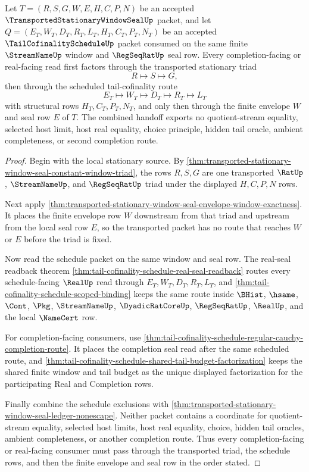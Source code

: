 \begin{theorem}
\label{thm:transported-stationary-window-seal-tail-cofinality-handoff}
Let $T=(R,S,G,W,E,H,C,P,N)$ be an accepted $\TransportedStationaryWindowSealUp$ packet, and let $Q=(E_T,W_T,D_T,R_T,L_T,H_T,C_T,P_T,N_T)$ be an accepted $\TailCofinalityScheduleUp$ packet consumed on the same finite $\StreamNameUp$ window and $\RegSeqRatUp$ seal row. Every completion-facing or real-facing read first factors through the transported stationary triad
$$
R \longmapsto S \longmapsto G,
$$
then through the scheduled tail-cofinality route
$$
E_T \longmapsto W_T \longmapsto D_T \longmapsto R_T \longmapsto L_T
$$
with structural rows $H_T,C_T,P_T,N_T$, and only then through the finite envelope $W$ and seal row $E$ of $T$. The combined handoff exports no quotient-stream equality, selected host limit, host real equality, choice principle, hidden tail oracle, ambient completeness, or second completion route.
\end{theorem}
\begin{proof}
Begin with the local stationary source. By \autoref{thm:transported-stationary-window-seal-constant-window-triad}, the rows $R,S,G$ are one transported $\RatUp$, $\StreamNameUp$, and $\RegSeqRatUp$ triad under the displayed $H,C,P,N$ rows.

Next apply \autoref{thm:transported-stationary-window-seal-envelope-window-exactness}. It places the finite envelope row $W$ downstream from that triad and upstream from the local seal row $E$, so the transported packet has no route that reaches $W$ or $E$ before the triad is fixed.

Now read the schedule packet on the same window and seal row. The real-seal readback theorem \autoref{thm:tail-cofinality-schedule-real-seal-readback} routes every schedule-facing $\RealUp$ read through $E_T,W_T,D_T,R_T,L_T$, and \autoref{thm:tail-cofinality-schedule-scoped-binding} keeps the same route inside $\BHist$, $\hsame$, $\Cont$, $\Pkg$, $\StreamNameUp$, $\DyadicRatCoreUp$, $\RegSeqRatUp$, $\RealUp$, and the local $\NameCert$ row.

For completion-facing consumers, use \autoref{thm:tail-cofinality-schedule-regular-cauchy-completion-route}. It places the completion seal read after the same scheduled route, and \autoref{thm:tail-cofinality-schedule-shared-tail-budget-factorization} keeps the shared finite window and tail budget as the unique displayed factorization for the participating Real and Completion rows.

Finally combine the schedule exclusions with \autoref{thm:transported-stationary-window-seal-ledger-nonescape}. Neither packet contains a coordinate for quotient-stream equality, selected host limits, host real equality, choice, hidden tail oracles, ambient completeness, or another completion route. Thus every completion-facing or real-facing consumer must pass through the transported triad, the schedule rows, and then the finite envelope and seal row in the order stated.
\end{proof}


